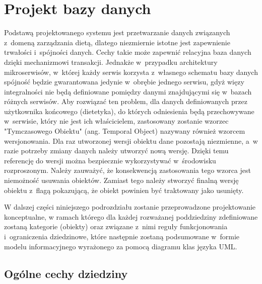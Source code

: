 
\section{Projekt bazy danych}\label{sec:database}

Podstawą projektowanego systemu jest przetwarzanie danych związanych z~domeną zarządzania dietą, dlatego niezmiernie istotne jest zapewnienie trwałości i~spójności danych.
Cechy takie może zapewnić relacyjna baza danych dzięki mechanizmowi transakcji\cite{book:bazury}.
Jednakże w~przypadku architektury mikroserwisów, w~której każdy serwis korzysta z~własnego schematu bazy danych spójność będzie gwarantowana jedynie w~obrębie jednego serwisu,
gdyż więzy integralności nie będą definiowane pomiędzy danymi znajdującymi się w~bazach różnych serwisów.
Aby rozwiązać ten problem, dla danych definiowanych przez użytkownika końcowego (dietetyka), do których odniesienia będą przechowywane w~serwisie, który nie jest ich właścicielem,
zastosowany zostanie wzorzec "Tymczasowego Obiektu" (ang. Temporal Object)\cite{url:temporal-object-pattern} nazywany również wzorcem wersjonowania.
Dla raz utworzonej wersji obiektu dane pozostają niezmienne, a~w razie potrzeby zmiany danych należy utworzyć nową wersję.
Dzięki temu referencję do wersji można bezpiecznie wykorzystywać w~środowisku rozproszonym.
Należy zauważyć, że konsekwencją zastosowania tego wzorca jest niemożność usuwania obiektów.
Zamiast tego należy stworzyć finalną wersję obiektu z~flagą pokazującą, że obiekt powinien być traktowany jako usunięty.

\par
W dalszej części niniejszego podrozdziału zostanie przeprowadzone projektowanie konceptualne,
w ramach którego dla każdej rozważanej poddziedziny zdefiniowane zostaną kategorie (obiekty) oraz związane z~nimi reguły funkcjonowania i~ograniczenia dziedzinowe\cite{book:bazury},
które następnie zostaną podsumowane w~formie modelu informacyjnego wyrażonego za pomocą diagramu klas języka UML.

\subsection{Ogólne cechy dziedziny}\label{ssubsubsec:database:domain}

